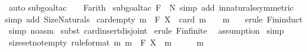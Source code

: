 \begin{isabellebody}
\isamarkupfalse%
\ {\isacharparenleft}auto{\isacharparenright}\isanewline
{}\isamarkupfalse%
{\isacharparenleft}subgoal{\isacharunderscore}tac\ {\isachardoublequoteopen}{}\ {\isasymle}\ {\isacharhash}\ F{\isachardoublequoteclose}{\isacharcomma}arith{\isacharparenright}\ \isanewline
{}\isamarkupfalse%
{\isacharparenleft}subgoal{\isacharunderscore}tac\ {\isachardoublequoteopen}{\isacharhash}F\ {\isacharcolon}\ {\isacharpercent}N{\isachardoublequoteclose}{\isacharcomma}\ simp\ add{\isacharcolon}\ in{\isacharunderscore}naturals{\isacharbrackleft}symmetric{\isacharbrackright}{\isacharparenright}\isanewline
{}\isamarkupfalse%
{\isacharparenleft}simp\ add{\isacharcolon}\ Size{\isacharunderscore}Naturals{\isacharparenright}\isanewline
{}\isamarkupfalse%
%
\endisatagproof
{\isafoldproof}%
%
\isadelimproof
\isanewline
%
\endisadelimproof
\isanewline
\isanewline
{}\isamarkupfalse%
\ card{\isacharunderscore}empty{}{\isacharcolon}\ {\isachardoublequoteopen}m\ {\isacharcolon}\ {\isacharpercent}F\ X\ {\isacharequal}{\isacharequal}{\isachargreater}\ {\isacharparenleft}{\isacharparenleft}card\ m\ {\isacharequal}\ {}{\isacharparenright}\ {\isacharequal}\ {\isacharparenleft}m\ {\isacharequal}\ {\isacharbraceleft}{\isacharbraceright}{\isacharparenright}{\isacharparenright}{\isachardoublequoteclose}\isanewline
%
\isadelimproof
%
\endisadelimproof
%
\isatagproof
{}\isamarkupfalse%
\ {\isacharparenleft}erule\ Fin{\isacharunderscore}induct{\isacharparenright}\isanewline
{}\isamarkupfalse%
\ {\isacharparenleft}simp\ {\isacharparenleft}no{\isacharunderscore}asm{\isacharparenright}{\isacharparenright}\isanewline
{}\isamarkupfalse%
\ {\isacharparenleft}subst\ card{\isacharunderscore}insert{\isacharunderscore}disjoint{\isacharparenright}\isanewline
{}\isamarkupfalse%
\ {\isacharparenleft}erule\ Fin{\isacharunderscore}finite{\isacharparenright}\isanewline
{}\isamarkupfalse%
\ \ assumption\isanewline
{}\isamarkupfalse%
\ simp\isanewline
{}\isamarkupfalse%
%
\endisatagproof
{\isafoldproof}%
%
\isadelimproof
\isanewline
%
\endisadelimproof
\isanewline
\isanewline
{}\isamarkupfalse%
\ size{\isacharunderscore}set{\isacharunderscore}notempty\ {\isacharbrackleft}rule{\isacharunderscore}format{\isacharbrackright}{\isacharcolon}\ {\isachardoublequoteopen}{\isacharbang}{\isacharbang}m{\isachardot}\ m\ {\isacharcolon}\ {\isacharpercent}F\ X\ {\isacharequal}{\isacharequal}{\isachargreater}\ m\ {\isachartilde}{\isacharequal}\ {\isacharbraceleft}{\isacharbraceright}\ {\isacharminus}{\isacharminus}{\isachargreater}\ {}\ {\isacharless}\ {\isacharhash}m{\isachardoublequoteclose}\isanewline

\end{isabellebody}

